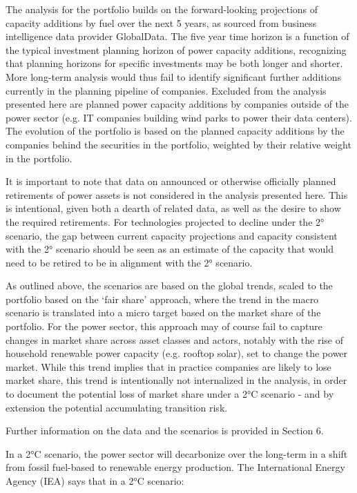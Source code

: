 \documentclass[10pt,table,a4]{article}\usepackage[]{graphicx}\usepackage[]{color}
\begin{document}
	
	\begin{multicols}{2}
		
		The analysis for the portfolio builds on the forward-looking projections of capacity additions by fuel over the next 5 years, as sourced from business intelligence data provider GlobalData. The five year time horizon is a function of the typical investment planning horizon of power capacity additions, recognizing that planning horizons for specific investments may be both longer and shorter. More long-term analysis would thus fail to identify significant further additions currently in the planning pipeline of companies. Excluded from the analysis presented here are planned power capacity additions by companies outside of the power sector (e.g. IT companies building wind parks to power their data centers). The evolution of the portfolio is based on the planned capacity additions by the companies behind the securities in the portfolio, weighted by their relative weight in the portfolio. 
		
		It is important to note that data on announced or otherwise officially planned retirements of power assets is not considered in the analysis presented here. This is intentional, given both a dearth of related data, as well as the desire to show the required retirements. For technologies projected to decline under the 2° scenario, the gap between current capacity projections and capacity consistent with the 2° scenario should be seen as an estimate of the capacity that would need to be retired to be in alignment with the 2° scenario. 
		
		As outlined above, the scenarios are based on the global trends, scaled to the portfolio based on the `fair share' approach, where the trend in the macro scenario is translated into a micro target based on the market share of the portfolio. For the power sector, this approach may of course fail to capture changes in market share across asset classes and actors, notably with the rise of household renewable power capacity (e.g. rooftop solar), set to change the power market. While this trend implies that in practice companies are likely to lose market share, this trend is intentionally not internalized in the analysis, in order to document the potential loss of market share under a 2°C scenario - and by extension the potential accumulating transition risk.
		
		Further information on the data and the scenarios is provided in Section 6. 
		
		In a 2°C scenario, the power sector will decarbonize over the long-term in a shift from fossil fuel-based to renewable energy production. The International Energy Agency (IEA) says that in a 2°C scenario:
		

\end{multicols}
\end{document}
